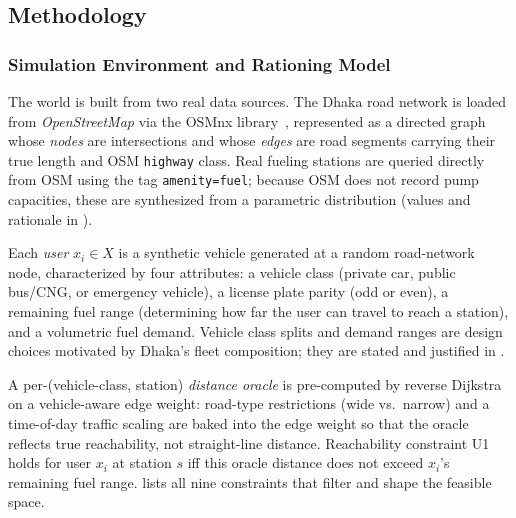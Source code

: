 \documentclass{ai-lab-report}
\begin{document}
\subsection{Methodology}

\subsubsection{Simulation Environment and Rationing Model}
\label{sec:a2env}
The world is built from two real data sources. The Dhaka road network is loaded from \emph{OpenStreetMap} via the \textsf{OSMnx} library~\citep{boeing2017osmnx}, represented as a directed graph whose \emph{nodes} are intersections and whose \emph{edges} are road segments carrying their true length and OSM \texttt{highway} class. Real fueling stations are queried directly from OSM using the tag \texttt{amenity=fuel}; because OSM does not record pump capacities, these are synthesized from a parametric distribution (values and rationale in ).

Each \emph{user} $x_i \in X$ is a synthetic vehicle generated at a random road-network node, characterized by four attributes: a vehicle class (private car, public bus/CNG, or emergency vehicle), a license plate parity (odd or even), a remaining fuel range (determining how far the user can travel to reach a station), and a volumetric fuel demand. Vehicle class splits and demand ranges are design choices motivated by Dhaka's fleet composition; they are stated and justified in .

A per-(vehicle-class, station) \emph{distance oracle} is pre-computed by reverse Dijkstra on a vehicle-aware edge weight: road-type restrictions (wide vs.\ narrow) and a time-of-day traffic scaling are baked into the edge weight so that the oracle reflects true reachability, not straight-line distance. Reachability constraint U1 holds for user $x_i$ at station $s$ iff this oracle distance does not exceed $x_i$'s remaining fuel range.  lists all nine constraints that filter and shape the feasible space.
\end{document}

